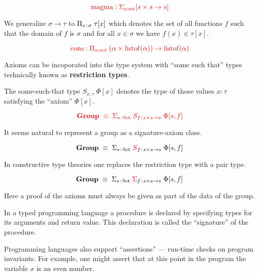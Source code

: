 {$${\color{red} \mathrm{magma}: \Sigma_{s:\mathrm{set}} [s\times s \rightarrow s]}$$


We generalize {\color{red} $\sigma \rightarrow \tau$} to {\color{red} $\Pi_{x\;\!:\!\;\sigma}\;\tau[x]$} which denotes the set of all functions $f$ such that the domain of
$f$ is $\sigma$ and for all $x \in \sigma$ we have $f(x) \in \tau[x]$.

\vfill
$${\color{red} \mathrm{\mathrm{cons}}: \Pi_{\alpha:\mathrm{set}}\; (\alpha \times \mathrm{listof}(\alpha)) \rightarrow \mathrm{listof}(\alpha)}$$


Axioms can be incoporated into the type system with ``some such that'' types technically known as {\bf restriction types}.

\vfill
The some-such-that type {\color{red}$S_{x:\tau}\;\Phi[x]$} denotes the type of those values $x:\tau$ satisfying the ``axiom'' $\Phi[x]$.

\vfill
$${\color{red} \mathbf{Group} \; \equiv \; \Sigma_{s\;\!:\!\;\mathrm{Set}}\;S_{f\;\!:\!\; s\times s \rightarrow s}\;\Phi[s,f]}$$
\vfill


It seems natural to represent a group as a signature-axiom class.

$$\mathbf{Group} \; \equiv \; \Sigma_{s\;\!:\!\;\mathrm{Set}}\;{\color{red} S}_{f\;\!:\!\; s\times s \rightarrow s}\;\Phi[s,f]$$

\vfill
In constructive type theories one replaces the restriction type
with a pair type.

$$\mathbf{Group} \; \equiv \; \Sigma_{s\;\!:\!\;\mathrm{Set}}\;{\color{red} \Sigma}_{f\;\!:\!\; s\times s \rightarrow s}\;\Phi[s,f]$$

\vfill
Here a proof of the axioms must always be given as part of the data of the group.



\vfill
In a typed programming language a procedure is declared by specifying types for its arguments and return value.  This declaration is called the ``signature'' of the procedure.

\vfill
Programming languages also support ``assertions'' --- run-time checks on program invariants.  For example, one might assert that at this point
in the program the variable $x$ is an even number.

}

